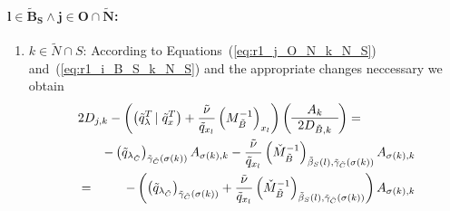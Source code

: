 \documentclass[a4paper]{article}
\begin{document}
\paragraph{$\mathbf{l \in \tilde{B}_{S} \wedge j \in O \cap \tilde{N}}$:}
\begin{enumerate}
\item $k \in \tilde{N} \cap S$:
According to Equations~(\ref{eq:r1_j_O_N_k_N_S})
and~(\ref{eq:r1_i_B_S_k_N_S}) and the appropriate changes neccessary we obtain
\begin{eqnarray}
\lefteqn{
2D_{j,k}-\left(
          \left(\tilde{q}_{\lambda}^{T}\left|\right. \tilde{q}_{x}^{T}\right)
	  +\frac{\tilde{\nu}}{\tilde{q}_{x_{l}}}
	  \left(M_{\tilde{B}}^{-1}\right)_{x_{l}}
	\right)
\left(\begin{array}{c}
        A_{k} \\
	\hline
	2D_{\tilde{B},k}
      \end{array}
\right)
=}
\nonumber \\
&&
-\left(\tilde{q}_{\lambda_{\tilde{C}}}\right)_{\tilde{\gamma}_{\tilde{C}}
  (\sigma(k))}A_{\sigma(k),k}
-\frac{\tilde{\nu}}{\tilde{q}_{x_{l}}}
 \left(\check{M}_{\tilde{B}}^{-1}\right)_{\tilde{\beta}_{S}(l),
  \tilde{\gamma}_{\tilde{C}}(\sigma(k))}A_{\sigma(k), k}
\nonumber \\
&=&
-\left(
  \left(\tilde{q}_{\lambda_{\tilde{C}}}\right)_{\tilde{\gamma}_{\tilde{C}}
   (\sigma(k))}
  +\frac{\tilde{\nu}}{\tilde{q}_{x_{l}}}
   \left(\check{M}_{\tilde{B}}^{-1}\right)_{\tilde{\beta}_{S}(l),
   \tilde{\gamma}_{\tilde{C}}(\sigma(k))}
\right)
A_{\sigma(k), k}    
\end{eqnarray}


\end{enumerate}
\end{document}
